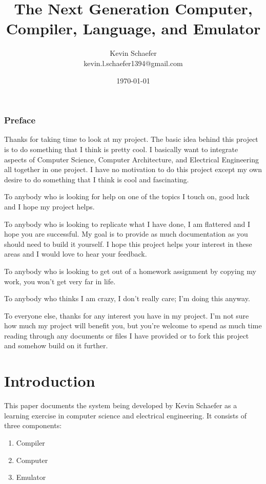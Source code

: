 \documentclass{book}
\title{The Next Generation Computer, Compiler, Language, and Emulator}
\date{\today}
\author{Kevin Schaefer \\ kevin.l.schaefer1394@gmail.com}
\begin{document}
\maketitle

\subsection*{Preface}
Thanks for taking time to look at my project. The basic idea behind this
project is to do something that I think is pretty cool. I basically want
to integrate aspects of Computer Science, Computer Architecture, and
Electrical Engineering all together in one project. I have no motivation
to do this project except my own desire to do something that I think is
cool and fascinating.

To anybody who is looking for help on one of the topics I touch on,
good luck and I hope my project helps.

To anybody who is looking to replicate what I have done, I am flattered
and I hope you are successful. My goal is to provide as much documentation
as you should need to build it yourself. I hope this project helps your
interest in these areas and I would love to hear your feedback.

To anybody who is looking to get out of a homework assignment by
copying my work, you won't get very far in life.

To anybody who thinks I am crazy, I don't really care; I'm doing this
anyway.

To everyone else, thanks for any interest you have in my project. I'm
not sure how much my project will benefit you, but you're welcome to
spend as much time reading through any documents or files I have provided
or to fork this project and somehow build on it further.


\tableofcontents

\chapter{Introduction}
This paper documents the system being developed by Kevin Schaefer as a learning
exercise in computer science and electrical engineering. It consists of three
components:
\begin{enumerate}
  \item Compiler
  \item Computer
  \item Emulator
\end{enumerate}
\end{document}
